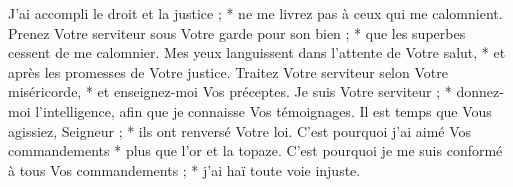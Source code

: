 J'ai accompli le droit et la justice ; * ne me livrez pas à ceux qui me calomnient.
\versseparator
Prenez Votre serviteur sous Votre garde pour son bien ; * que les superbes cessent de me calomnier.
\versseparator
Mes yeux languissent dans l'attente de Votre salut, * et après les promesses de Votre justice.
\versseparator
Traitez Votre serviteur selon Votre miséricorde, * et enseignez-moi Vos préceptes.
\versseparator
Je suis Votre serviteur ; * donnez-moi l'intelligence, afin que je connaisse Vos témoignages.
\versseparator
Il est temps que Vous agissiez, Seigneur ; * ils ont renversé Votre loi.
\versseparator
C'est pourquoi j'ai aimé Vos commandements * plus que l'or et la topaze.
\versseparator
C'est pourquoi je me suis conformé à tous Vos commandements ; * j'ai haï toute voie injuste.
